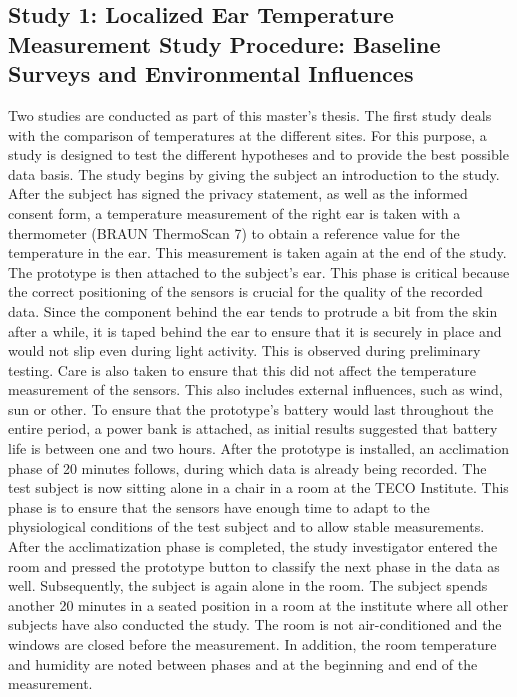 \subsection{Study 1: Localized Ear Temperature Measurement Study Procedure: Baseline Surveys and Environmental Influences}
\label{ch:Design:Study:Study1}
Two studies are conducted as part of this master's thesis. 
The first study deals with the comparison of temperatures at the different sites.
For this purpose, a study is designed to test the different hypotheses and to provide the best possible data basis. 
The study begins by giving the subject an introduction to the study. 
After the subject has signed the privacy statement, as well as the informed consent form, a temperature measurement of the right ear is taken with a thermometer (BRAUN ThermoScan 7) to obtain a reference value for the temperature in the ear. 
This measurement is taken again at the end of the study.
The prototype is then attached to the subject's ear. 
This phase is critical because the correct positioning of the sensors is crucial for the quality of the recorded data.
Since the component behind the ear tends to protrude a bit from the skin after a while, it is taped behind the ear to ensure that it is securely in place and would not slip even during light activity. 
This is observed during preliminary testing. 
Care is also taken to ensure that this did not affect the temperature measurement of the sensors.
This also includes external influences, such as wind, sun or other.
To ensure that the prototype's battery would last throughout the entire period, a power bank is attached, as initial results suggested that battery life is between one and two hours.
After the prototype is installed, an acclimation phase of 20 minutes follows, during which data is already being recorded. 
The test subject is now sitting alone in a chair in a room at the TECO Institute.
This phase is to ensure that the sensors have enough time to adapt to the physiological conditions of the test subject and to allow stable measurements.
After the acclimatization phase is completed, the study investigator entered the room and pressed the prototype button to classify the next phase in the data as well.
Subsequently, the subject is again alone in the room. 
The subject spends another 20 minutes in a seated position in a room at the institute where all other subjects have also conducted the study. 
The room is not air-conditioned and the windows are closed before the measurement.
In addition, the room temperature and humidity are noted between phases and at the beginning and end of the measurement. 
